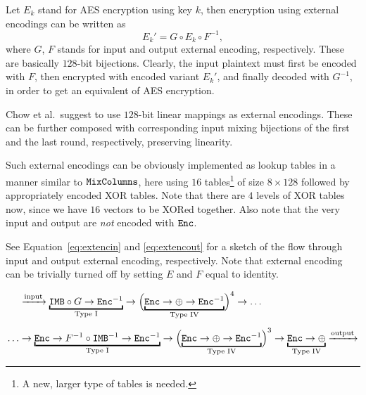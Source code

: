 	Let $E_k$ stand for AES encryption using key $k$, then encryption using external encodings can be written as
	\begin{equation}
	\label{eq:extenc}
		E_k' = G \circ E_k \circ F^{-1} ,
	\end{equation}
	where $G$, $F$ stands for input and output external encoding, respectively. These are basically $128$-bit bijections. Clearly, the input plaintext must first be encoded with $F$, then encrypted with encoded variant $E_k'$, and finally decoded with $G^{-1}$, in order to get an equivalent of AES encryption.
	
	Chow et al.\ suggest to use $128$-bit linear mappings as external encodings. These can be further composed with corresponding input mixing bijections of the first and the last round, respectively, preserving linearity.
	
	Such external encodings can be obviously implemented as lookup tables in a manner similar to $\texttt{MixColumns}$, here using $16$ tables\footnote{A new, larger type of tables is needed.} of size $8\times 128$ followed by appropriately encoded XOR tables. Note that there are $4$ levels of XOR tables now, since we have $16$ vectors to be XORed together. Also note that the very input and output are {\em not} encoded with $\texttt{Enc}$.
	
	See Equation~\ref{eq:extencin} and \ref{eq:extencout} for a sketch of the flow through input and output external encoding, respectively. Note that external encoding can be trivially turned off by setting $E$ and $F$ equal to identity.
	
	\begin{align}
	\label{eq:extencin}
		&\xrightarrow{\textnormal{input}}\underbracket{\IMB\circ G\rarr\Enc^{-1}}_{\textnormal{Type I}}\rarr\Bigl(\underbracket{\Enc\rarr\xor\rarr\Enc^{-1}}_{\textnormal{Type IV}}\Bigr)^4\rarr\ldots\\[.5em]
	\label{eq:extencout}
		\ldots&\rarr\underbracket{\Enc\rarr F^{-1}\circ\IMB^{-1}\rarr\Enc^{-1}}_{\textnormal{Type I}}\rarr\Bigl(\underbracket{\Enc\rarr\xor\rarr\Enc^{-1}}_{\textnormal{Type IV}}\Bigr)^3\rarr\underbracket{\Enc\rarr\xor}_{\textnormal{Type IV}}\xrightarrow{\textnormal{output}}
	\end{align}



